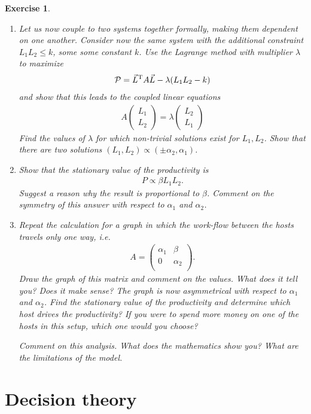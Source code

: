 \documentclass{book}
\newtheorem{exercise}{Exercise}
\def\beq{\begin{eqnarray}}
\def\eeq{\end{eqnarray}}
\begin{document}
\begin{exercise}
\begin{enumerate}
\item Let us now couple to two systems together formally, making them dependent on one another.
Consider now the same system with the additional constraint $L_1 L_2
\le k$, some some constant $k$.  Use the Lagrange method with
multiplier $\lambda$ to maximize
\beq
{\cal P} =  \vec L^{\rm T} A \vec L - \lambda (L_1L_2 - k)
\eeq
and show that this leads to the coupled linear equations
\beq
A  \left(\begin{array}{c}
L_1\\L_2
\end{array}\right) = \lambda \left(\begin{array}{c}
L_2\\L_1
\end{array}\right)
\eeq
Find the values of $\lambda$ for which non-trivial solutions exist for
$L_1,L_2$.  Show that there are two solutions $(L_1,L_2) \propto 
(\pm\alpha_2,\alpha_1)$.

\item Show that the stationary value of the productivity is
\beq
P \propto \beta L_1L_2.
\eeq
Suggest a reason why the result is proportional to $\beta$.  Comment
on the symmetry of this answer with respect to $\alpha_1$ and
$\alpha_2$.


\item Repeat the calculation for a graph in which the work-flow between
the hosts travels only one way, i.e. 
\beq
A = \left(
\begin{array}{cc}
\alpha_1 & \beta\\
0 & \alpha_2\\
\end{array}
\right).
\eeq
Draw the graph of this matrix and comment on the values. What does it
tell you? Does it make sense? The graph is now asymmetrical with
respect to $\alpha_1$ and $\alpha_2$.  Find the stationary value of
the productivity and determine which host drives the productivity? If
you were to spend more money on one of the hosts in this setup, which
one would you choose?

Comment on this analysis. What does the mathematics show you? What are
the limitations of the model.
\end{enumerate}
\end{exercise}
\begin{solution}
\end{solution}



\chapter{Decision theory}
\end{document}
